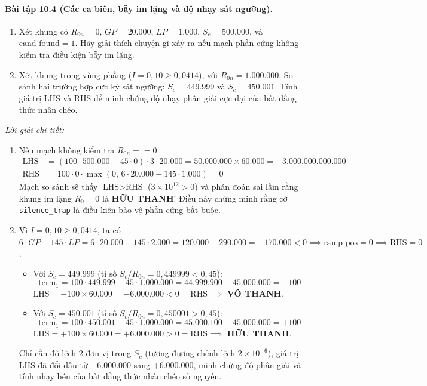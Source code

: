 \paragraph{Bài tập 10.4 (Các ca biên, bẫy im lặng và độ nhạy sát ngưỡng).}
\begin{enumerate}[label=(\alph*)]
    \item Xét khung có $R_{0n} = 0$, $GP = 20.000$, $LP = 1.000$, $S_c = 500.000$, và $\text{cand\_found} = 1$. Hãy giải thích chuyện gì xảy ra nếu mạch phần cứng không kiểm tra điều kiện bẫy im lặng.
    \item Xét khung trong vùng phẳng ($I = 0{,}10 \ge 0{,}0414$), với $R_{0n} = 1.000.000$. So sánh hai trường hợp cực kỳ sát ngưỡng: $S_c = 449.999$ và $S_c = 450.001$. Tính giá trị LHS và RHS để minh chứng độ nhạy phân giải cực đại của bất đẳng thức nhân chéo.
\end{enumerate}

\textit{Lời giải chi tiết:}
\begin{enumerate}[label=(\alph*)]
    \item Nếu mạch không kiểm tra $R_{0n} == 0$:
    \begin{align*}
        \text{LHS} &= (100 \cdot 500.000 - 45 \cdot 0) \cdot 3 \cdot 20.000 = 50.000.000 \times 60.000 = +3.000.000.000.000 \\
        \text{RHS} &= 100 \cdot 0 \cdot \max(0,\, 6\cdot 20.000 - 145\cdot 1.000) = 0
    \end{align*}
    Mạch so sánh sẽ thấy $\text{LHS} > \text{RHS}$ ($3 \times 10^{12} > 0$) và phán đoán sai lầm rằng khung im lặng $R_0 = 0$ là \textbf{HỮU THANH}! Điều này chứng minh rằng cờ \texttt{silence\_trap} là điều kiện bảo vệ phần cứng bắt buộc.
    \item Vì $I = 0{,}10 \ge 0{,}0414$, ta có $6 \cdot GP - 145 \cdot LP = 6\cdot 20.000 - 145\cdot 2.000 = 120.000 - 290.000 = -170.000 < 0 \implies \text{ramp\_pos} = 0 \implies \text{RHS} = 0$.
    \begin{itemize}
        \item Với $S_c = 449.999$ (tỉ số $S_c / R_{0n} = 0{,}449999 < 0{,}45$):
        \begin{equation*}
            \text{term}_1 = 100 \cdot 449.999 - 45 \cdot 1.000.000 = 44.999.900 - 45.000.000 = -100
        \end{equation*}
        $\text{LHS} = -100 \times 60.000 = -6.000.000 < 0 = \text{RHS} \implies$ \textbf{VÔ THANH}.
        \item Với $S_c = 450.001$ (tỉ số $S_c / R_{0n} = 0{,}450001 > 0{,}45$):
        \begin{equation*}
            \text{term}_1 = 100 \cdot 450.001 - 45 \cdot 1.000.000 = 45.000.100 - 45.000.000 = +100
        \end{equation*}
        $\text{LHS} = +100 \times 60.000 = +6.000.000 > 0 = \text{RHS} \implies$ \textbf{HỮU THANH}.
    \end{itemize}
    Chỉ cần độ lệch 2 đơn vị trong $S_c$ (tương đương chênh lệch $2 \times 10^{-6}$), giá trị LHS đã đổi dấu từ $-6.000.000$ sang $+6.000.000$, minh chứng độ phân giải và tính nhạy bén của bất đẳng thức nhân chéo số nguyên.
\end{enumerate}

